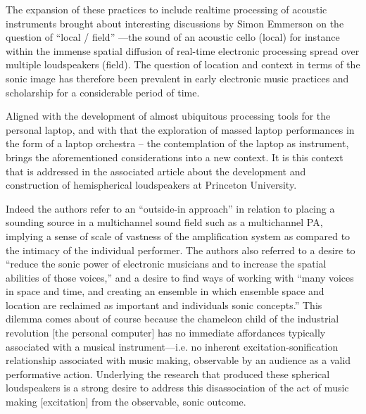 The expansion of these practices to include realtime processing of acoustic instruments brought about interesting discussions by Simon Emmerson on the question of ``local / field'' \cite{Emmerson:1994}---the sound of an acoustic cello (local) for instance within the immense spatial diffusion of real-time electronic processing spread over multiple loudspeakers (field). The question of location and context in terms of the sonic image has therefore been prevalent in early electronic music practices and scholarship for a considerable period of time.

Aligned with the development of almost ubiquitous processing tools for the personal laptop, and with that the exploration of massed laptop performances in the form of a laptop orchestra – the contemplation of the laptop as instrument, brings the aforementioned considerations into a new context. It is this context that is addressed in the associated article about the development and construction of hemispherical loudspeakers at Princeton University.

Indeed the authors refer to an ``outside-in approach'' in relation to placing a sounding source in a multichannel sound field such as a multichannel PA, implying a sense of scale of vastness of the amplification system as compared to the intimacy of the individual performer. The authors also referred to a desire to ``reduce the sonic power of electronic musicians and to increase the spatial abilities of those voices,'' and a desire to find ways of working with ``many voices in space and time, and creating an ensemble in which ensemble space and location are reclaimed as important and individuals sonic concepts.'' This dilemma comes about of course because the chameleon child of the industrial revolution [the personal computer] has no immediate affordances typically associated with a musical instrument---i.e. no inherent excitation-sonification relationship associated with music making, observable by an audience as a valid performative action. Underlying the research that produced these spherical loudspeakers is a strong desire to address this disassociation of the act of music making [excitation] from the observable, sonic outcome.


